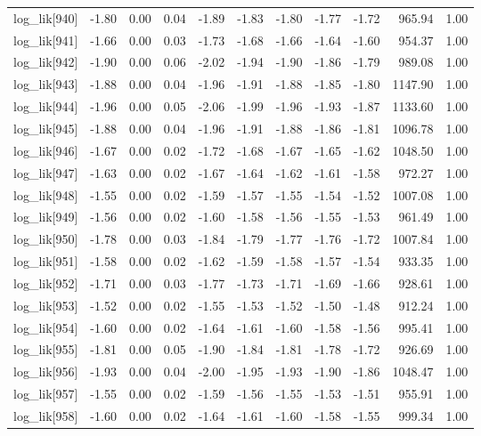 \begin{table}[ht]
\begin{tabular}{rrrrrrrrrrr}
  log\_lik[940] & -1.80 & 0.00 & 0.04 & -1.89 & -1.83 & -1.80 & -1.77 & -1.72 & 965.94 & 1.00 \\ 
  log\_lik[941] & -1.66 & 0.00 & 0.03 & -1.73 & -1.68 & -1.66 & -1.64 & -1.60 & 954.37 & 1.00 \\ 
  log\_lik[942] & -1.90 & 0.00 & 0.06 & -2.02 & -1.94 & -1.90 & -1.86 & -1.79 & 989.08 & 1.00 \\ 
  log\_lik[943] & -1.88 & 0.00 & 0.04 & -1.96 & -1.91 & -1.88 & -1.85 & -1.80 & 1147.90 & 1.00 \\ 
  log\_lik[944] & -1.96 & 0.00 & 0.05 & -2.06 & -1.99 & -1.96 & -1.93 & -1.87 & 1133.60 & 1.00 \\ 
  log\_lik[945] & -1.88 & 0.00 & 0.04 & -1.96 & -1.91 & -1.88 & -1.86 & -1.81 & 1096.78 & 1.00 \\ 
  log\_lik[946] & -1.67 & 0.00 & 0.02 & -1.72 & -1.68 & -1.67 & -1.65 & -1.62 & 1048.50 & 1.00 \\ 
  log\_lik[947] & -1.63 & 0.00 & 0.02 & -1.67 & -1.64 & -1.62 & -1.61 & -1.58 & 972.27 & 1.00 \\ 
  log\_lik[948] & -1.55 & 0.00 & 0.02 & -1.59 & -1.57 & -1.55 & -1.54 & -1.52 & 1007.08 & 1.00 \\ 
  log\_lik[949] & -1.56 & 0.00 & 0.02 & -1.60 & -1.58 & -1.56 & -1.55 & -1.53 & 961.49 & 1.00 \\ 
  log\_lik[950] & -1.78 & 0.00 & 0.03 & -1.84 & -1.79 & -1.77 & -1.76 & -1.72 & 1007.84 & 1.00 \\ 
  log\_lik[951] & -1.58 & 0.00 & 0.02 & -1.62 & -1.59 & -1.58 & -1.57 & -1.54 & 933.35 & 1.00 \\ 
  log\_lik[952] & -1.71 & 0.00 & 0.03 & -1.77 & -1.73 & -1.71 & -1.69 & -1.66 & 928.61 & 1.00 \\ 
  log\_lik[953] & -1.52 & 0.00 & 0.02 & -1.55 & -1.53 & -1.52 & -1.50 & -1.48 & 912.24 & 1.00 \\ 
  log\_lik[954] & -1.60 & 0.00 & 0.02 & -1.64 & -1.61 & -1.60 & -1.58 & -1.56 & 995.41 & 1.00 \\ 
  log\_lik[955] & -1.81 & 0.00 & 0.05 & -1.90 & -1.84 & -1.81 & -1.78 & -1.72 & 926.69 & 1.00 \\ 
  log\_lik[956] & -1.93 & 0.00 & 0.04 & -2.00 & -1.95 & -1.93 & -1.90 & -1.86 & 1048.47 & 1.00 \\ 
  log\_lik[957] & -1.55 & 0.00 & 0.02 & -1.59 & -1.56 & -1.55 & -1.53 & -1.51 & 955.91 & 1.00 \\ 
  log\_lik[958] & -1.60 & 0.00 & 0.02 & -1.64 & -1.61 & -1.60 & -1.58 & -1.55 & 999.34 & 1.00 \\ 

\end{tabular}
\end{table}

